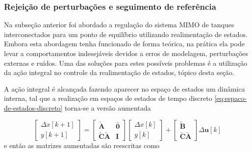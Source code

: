 \subsubsection{Rejeição de perturbações e seguimento de referência}
\label{subsub:rejeicao-de-perturbacoes-e-seguimento-de-referencia}

Na subseção anterior foi abordado a regulação do sistema MIMO de tanques
interconectados para um ponto de equilíbrio utilizando realimentação de estados.
Embora esta abordagem tenha funcionado de forma teórica, na prática ela pode
levar a comportamentos indesejáveis devidos a erros de modelagem, perturbações
externas e ruídos. Uma das soluções para estes possíveis problemas é a
utilização da ação integral no controle da realimentação de estados, tópico
desta seção.

A ação integral é alcançada fazendo aparecer no espaço de estados um
dinâmica interna, tal que a realização em espaços de estados de tempo discreto
\ref{eq:espaco-de-estados-discreto} torna-se a versão aumentada

\begin{equation}
    \label{eq:espaco-de-estados-discreto-aumentado}
    \begin{bmatrix}
        \Delta x[k+1]\\ 
        y[k+1]
    \end{bmatrix}
    =
    \begin{bmatrix}
        \mathbf{\tilde{A}} & \mathbf{\bar{0}}\\ 
        \mathbf{\tilde{C}}\mathbf{\tilde{A}} & \mathbf{I}
    \end{bmatrix}
    \begin{bmatrix}
        \Delta x[k]\\ 
        y[k]
    \end{bmatrix}
    +
    \begin{bmatrix}
        \mathbf{\tilde{B}}\\ 
        \mathbf{\tilde{C}}\mathbf{\tilde{A}}
    \end{bmatrix}
    \Delta \mathbf{u}[k]
\end{equation} e então as matrizes aumentadas são reescritas como

